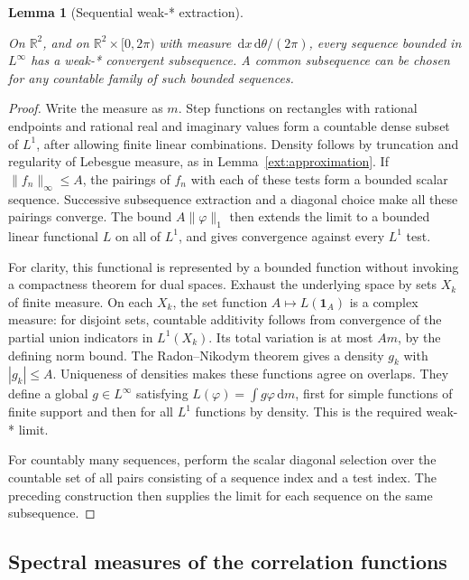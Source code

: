 \documentclass[11pt]{amsart}
\newcommand{\R}{\mathbb R}
\newcommand{\dd}{\,\mathrm d}
\newcommand{\one}{\mathbf 1}
\newtheorem{lemma}[theorem]{Lemma}
\theoremstyle{definition}
\theoremstyle{remark}
\numberwithin{equation}{section}
\providecommand{\lean}[1]{}
\providecommand{\leanok}{}
\begin{document}
\begin{lemma}[Sequential weak-* extraction]\label{ext:weakstar}
\lean{Auto.ext_weakstar_plane,Auto.ext_weakstar_plane_countable,Auto.ext_weakstar_config,Auto.ext_weakstar_config_countable}
\leanok
On $\R^2$, and on $\R^2\times[0,2\pi)$ with measure
$\dd x\dd\theta/(2\pi)$, every sequence bounded in
$L^\infty$ has a weak-* convergent subsequence.  A common
subsequence can be chosen for any countable family of such
bounded sequences.
\end{lemma}
\begin{proof}
Write the measure as $m$.  Step functions on rectangles with
rational endpoints and rational real and imaginary values
form a countable dense subset of $L^1$, after allowing finite
linear combinations.  Density follows by truncation and
regularity of Lebesgue measure, as in
Lemma~\ref{ext:approximation}.  If $\|f_n\|_\infty\le A$,
the pairings of $f_n$ with each of these tests form a bounded
scalar sequence.  Successive subsequence extraction and a
diagonal choice make all these pairings converge.  The bound
$A\|\varphi\|_1$ then extends the limit to a bounded linear
functional $L$ on all of $L^1$, and gives convergence against
every $L^1$ test.

For clarity, this functional is represented by a bounded
function without invoking a compactness theorem for dual
spaces.  Exhaust the underlying space by sets $X_k$ of finite
measure.  On each $X_k$, the set function
$A\mapsto L(\one_A)$ is a complex measure: for disjoint sets,
countable additivity follows from convergence of the partial
union indicators in $L^1(X_k)$.  Its total variation is at
most $A m$, by the defining norm bound.  The Radon--Nikodym
theorem gives a density $g_k$ with $|g_k|\le A$.
Uniqueness of densities makes these functions agree on
overlaps.  They define a global $g\in L^\infty$ satisfying
$L(\varphi)=\int g\varphi\dd m$, first for simple functions
of finite support and then for all $L^1$ functions by density.
This is the required weak-* limit.

For countably many sequences, perform the scalar diagonal
selection over the countable set of all pairs consisting of
a sequence index and a test index.  The preceding construction
then supplies the limit for each sequence on the same
subsequence.
\end{proof}

\subsection{Spectral measures of the correlation functions}
\end{document}
